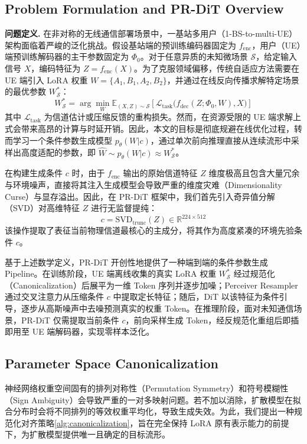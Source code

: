 \documentclass[12pt,a4paper]{article}
\begin{document}
\subsection{Problem Formulation and PR-DiT Overview}
\label{subsec:overview}
\textbf{问题定义.} 在非对称的无线通信部署场景中，一基站多用户（1-BS-to-multi-UE）架构面临着严峻的泛化挑战。假设基站端的预训练编码器固定为 $f_{\text{enc}}$，用户（UE）端预训练解码器的主干参数固定为 $\Phi_0$。对于任意异质的未知微场景 $\mathcal{S}$，给定输入信号 $X$，编码特征为 $Z = f_{\text{enc}}(X)$。为了克服领域偏移，传统自适应方法需要在 UE 端引入 LoRA 权重 $W = \{A_1, B_1, A_2, B_2\}$，并通过在线反向传播求解特定场景的最优参数 $W^*_{\mathcal{S}}$：
\begin{equation}
W^*_{\mathcal{S}} = \arg\min_{W} \mathbb{E}_{(X, Z) \sim \mathcal{S}} \left[ \mathcal{L}_{\text{task}} \big( f_{\text{dec}}(Z; \Phi_0, W), X \big) \right]
\end{equation}
其中 $\mathcal{L}_{\text{task}}$ 为信道估计或压缩反馈的重构损失。然而，在资源受限的 UE 端求解上式会带来高昂的计算与时延开销。因此，本文的目标是彻底规避在线优化过程，转而学习一个条件参数生成模型 $p_\theta(W | c)$，通过单次前向推理直接从连续流形中采样出高度适配的参数，即 $\hat{W} \sim p_\theta(W | c) \approx W^*_{\mathcal{S}}$。

在构建生成条件 $c$ 时，由于 $f_{\text{enc}}$ 输出的原始信道特征 $Z$ 维度极高且包含大量冗余与环境噪声，直接将其注入生成模型会导致严重的维度灾难（Dimensionality Curse）与显存溢出。因此，在 PR-DiT 框架中，我们首先引入奇异值分解（SVD）对高维特征 $Z$ 进行无监督提纯：
\begin{equation}
c = \text{SVD}_{\text{trunc}}(Z) \in \mathbb{R}^{224 \times 512}
\end{equation}
该操作提取了表征当前物理信道最核心的主成分，将其作为高度紧凑的环境先验条件 $c$。

基于上述数学定义，PR-DiT 开创性地提供了一种端到端的条件参数生成 Pipeline。在训练阶段，UE 端离线收集的真实 LoRA 权重 $W^*_{\mathcal{S}}$ 经过规范化（Canonicalization）后展平为一维 Token 序列并逐步加噪；Perceiver Resampler 通过交叉注意力从压缩条件 $c$ 中提取定长特征；随后，DiT 以该特征为条件引导，逐步从高斯噪声中去噪预测真实的权重 Token。在推理阶段，面对未知通信场景，PR-DiT 仅需提取当前条件 $c$，前向采样生成 Token，经反规范化重组后即插即用至 UE 端解码器，实现零样本泛化。

\subsection{Parameter Space Canonicalization}
\label{subsec:canonicalization}
神经网络权重空间固有的排列对称性（Permutation Symmetry）和符号模糊性（Sign Ambiguity）会导致严重的一对多映射问题。若不加以消除，扩散模型在拟合分布时会将不同排列的等效权重平均化，导致生成失效。为此，我们提出一种规范化对齐策略\ref{alg:canonicalization}，旨在完全保持 LoRA 原有表示能力的前提下，为扩散模型提供唯一且确定的目标流形。
\end{document}
